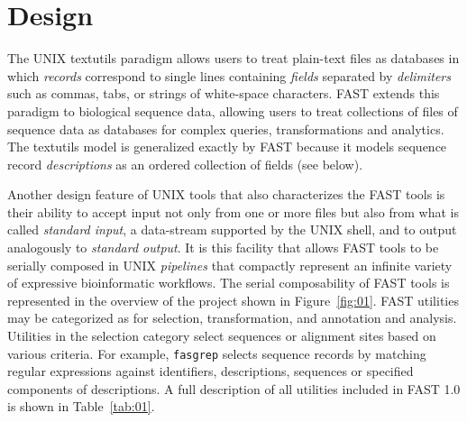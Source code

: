 \documentclass{frontiersSCNS} %
\begin{document}
\section{Design}

The UNIX textutils paradigm allows users to treat plain-text files as
databases in which {\it records} correspond to single lines containing
{\it fields} separated by {\it delimiters} such as commas, tabs, or
strings of white-space characters.  FAST extends this paradigm to
biological sequence data, allowing users to treat collections of files
of sequence data as databases for complex queries, transformations and
analytics. The textutils model is generalized exactly by FAST because
it models sequence record {\it descriptions} as an ordered
collection of fields (see below).

Another design feature of UNIX tools that also characterizes the FAST
tools is their ability to accept input not only from one or more files
but also from what is called {\it standard input}, a data-stream
supported by the UNIX shell, and to output analogously to {\it
  standard output}. It is this facility that allows FAST tools to be
serially composed in UNIX {\it pipelines} that compactly represent an
infinite variety of expressive bioinformatic workflows. The serial
composability of FAST tools is represented in the overview of the
project shown in Figure~\ref{fig:01}.  FAST utilities may be
categorized as for selection, transformation, and annotation and
analysis. Utilities in the selection category select sequences or
alignment sites based on various criteria. For example, {\tt fasgrep}
selects sequence records by matching regular expressions against
identifiers, descriptions, sequences or specified components of
descriptions. A full description of all utilities included in FAST 1.0
is shown in Table~\ref{tab:01}.
\end{document}
